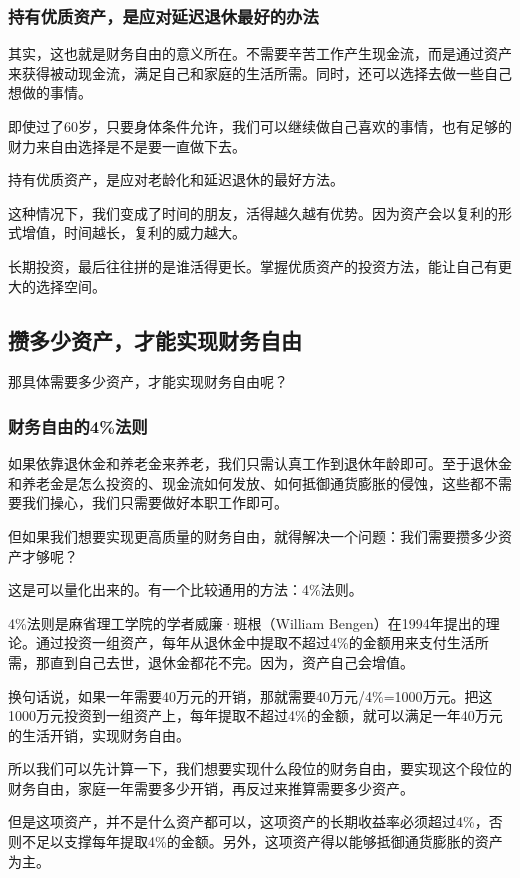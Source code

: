 \subsubsection{持有优质资产，是应对延迟退休最好的办法}

其实，这也就是财务自由的意义所在。不需要辛苦工作产生现金流，而是通过资产来获得被动现金流，满足自己和家庭的生活所需。同时，还可以选择去做一些自己想做的事情。

即使过了60岁，只要身体条件允许，我们可以继续做自己喜欢的事情，也有足够的财力来自由选择是不是要一直做下去。

持有优质资产，是应对老龄化和延迟退休的最好方法。

这种情况下，我们变成了时间的朋友，活得越久越有优势。因为资产会以复利的形式增值，时间越长，复利的威力越大。

长期投资，最后往往拼的是谁活得更长。掌握优质资产的投资方法，能让自己有更大的选择空间。

\subsection{攒多少资产，才能实现财务自由}
那具体需要多少资产，才能实现财务自由呢？

\subsubsection{财务自由的4\%法则}

如果依靠退休金和养老金来养老，我们只需认真工作到退休年龄即可。至于退休金和养老金是怎么投资的、现金流如何发放、如何抵御通货膨胀的侵蚀，这些都不需要我们操心，我们只需要做好本职工作即可。

但如果我们想要实现更高质量的财务自由，就得解决一个问题：我们需要攒多少资产才够呢？

这是可以量化出来的。有一个比较通用的方法：4\%法则。

4\%法则是麻省理工学院的学者威廉·班根（William Bengen）在1994年提出的理论。通过投资一组资产，每年从退休金中提取不超过4\%的金额用来支付生活所需，那直到自己去世，退休金都花不完。因为，资产自己会增值。

换句话说，如果一年需要40万元的开销，那就需要40万元/4\%=1000万元。把这1000万元投资到一组资产上，每年提取不超过4\%的金额，就可以满足一年40万元的生活开销，实现财务自由。

所以我们可以先计算一下，我们想要实现什么段位的财务自由，要实现这个段位的财务自由，家庭一年需要多少开销，再反过来推算需要多少资产。

但是这项资产，并不是什么资产都可以，这项资产的长期收益率必须超过4\%，否则不足以支撑每年提取4\%的金额。另外，这项资产得以能够抵御通货膨胀的资产为主。

